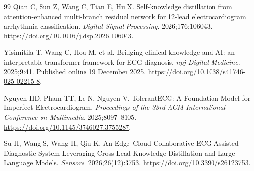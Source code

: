 \documentclass[11pt,a4paper]{article}
\begin{document}
\begin{thebibliography}{99}
 Qian C, Sun Z, Wang C, Tian E, Hu X. Self-knowledge distillation from attention-enhanced multi-branch residual network for 12-lead electrocardiogram arrhythmia classification. \emph{Digital Signal Processing}. 2026;176:106043. \url{https://doi.org/10.1016/j.dsp.2026.106043}.

 Yisimitila T, Wang C, Hou M, et al. Bridging clinical knowledge and AI: an interpretable transformer framework for ECG diagnosis. \emph{npj Digital Medicine}. 2025;9:41. Published online 19 December 2025. \url{https://doi.org/10.1038/s41746-025-02215-8}.

 Nguyen HD, Pham TT, Le N, Nguyen V. TolerantECG: A Foundation Model for Imperfect Electrocardiogram. \emph{Proceedings of the 33rd ACM International Conference on Multimedia}. 2025;8097--8105. \url{https://doi.org/10.1145/3746027.3755287}.

 Su H, Wang S, Wang H, Qiu K. An Edge--Cloud Collaborative ECG-Assisted Diagnostic System Leveraging Cross-Lead Knowledge Distillation and Large Language Models. \emph{Sensors}. 2026;26(12):3753. \url{https://doi.org/10.3390/s26123753}.
\end{thebibliography}
\endgroup
\end{document}
